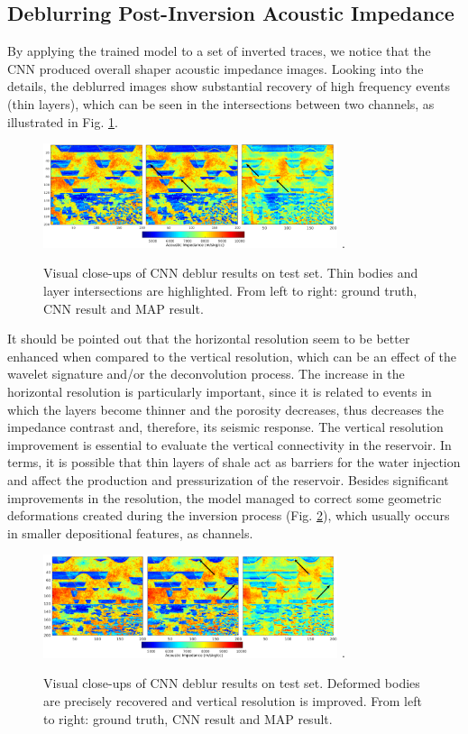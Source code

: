 \documentclass[journal]{IEEEtran}
\begin{document}
\subsection{Deblurring Post-Inversion Acoustic Impedance}
By applying the trained model to a set of inverted traces,
we notice that the CNN produced overall shaper acoustic
impedance images. Looking into the details,
the deblurred images show substantial recovery of high frequency events
(thin layers), which can be seen in the intersections between
two channels, as illustrated in Fig. \ref{ImSec26}.
\begin{figure}[!t]
\centering
\includegraphics[width=3.4in]{Figs/__ImSec26}
\DeclareGraphicsExtensions.
\caption{Visual close-ups of CNN deblur results on test set. Thin bodies and
layer intersections are highlighted. From left to right: ground truth, CNN result and MAP result.}
\label{ImSec26}
\end{figure}

It should be pointed out that the horizontal resolution seem to be
better enhanced when compared to the vertical resolution, which can
be an effect of the wavelet signature and/or the deconvolution process.
The increase in the horizontal resolution is particularly important,
since it is related to events in which the layers become thinner and the porosity
decreases, thus decreases the impedance contrast and, therefore, its
seismic response. The vertical resolution improvement is essential to
evaluate the vertical connectivity in the reservoir. In terms, it is possible
that thin layers of shale act as barriers for the water injection and affect the production
and pressurization of the reservoir. Besides significant improvements
in the resolution, the model managed to correct some geometric deformations
created during the inversion process (Fig. \ref{ImSec36}), which usually
occurs in smaller depositional features, as channels.
\begin{figure}[!t]
\centering
\includegraphics[width=3.4in]{Figs/__ImSec36}
\DeclareGraphicsExtensions.
\caption{Visual close-ups of CNN deblur results on test set. Deformed bodies
are precisely recovered and vertical resolution is improved. From left to right: ground truth, CNN result and MAP result.}
\label{ImSec36}
\end{figure}
\end{document}

